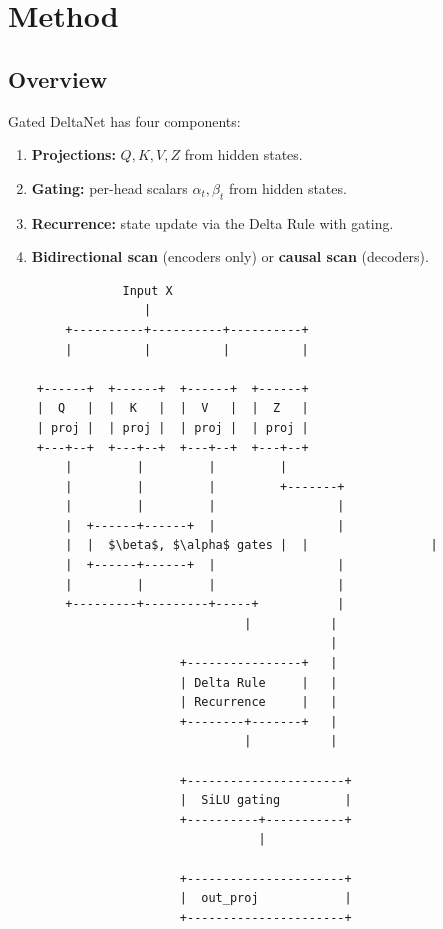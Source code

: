 
\section{Method}

\subsection{Overview}

Gated DeltaNet has four components:

\begin{enumerate}
\item \textbf{Projections:} $Q, K, V, Z$ from hidden states.
\item \textbf{Gating:} per-head scalars $\alpha_t, \beta_t$ from hidden states.
\item \textbf{Recurrence:} state update via the Delta Rule with gating.
\item \textbf{Bidirectional scan} (encoders only) or \textbf{causal scan} (decoders).

\end{enumerate}
\begin{lstlisting}
                Input X
                   |
        +----------+----------+----------+
        |          |          |          |
                                          
    +------+  +------+  +------+  +------+
    |  Q   |  |  K   |  |  V   |  |  Z   |
    | proj |  | proj |  | proj |  | proj |
    +---+--+  +---+--+  +---+--+  +---+--+
        |         |         |         |
        |         |         |         +-------+
        |         |         |                 |
        |  +------+------+  |                 |
        |  |  $\beta$, $\alpha$ gates |  |                 |
        |  +------+------+  |                 |
        |         |         |                 |
        +---------+---------+-----+           |
                                 |           |
                                             |
                        +----------------+   |
                        | Delta Rule     |   |
                        | Recurrence     |   |
                        +--------+-------+   |
                                 |           |
                                              
                        +----------------------+
                        |  SiLU gating         |
                        +----------+-----------+
                                   |
                                    
                        +----------------------+
                        |  out_proj            |
                        +----------------------+
\end{lstlisting}

